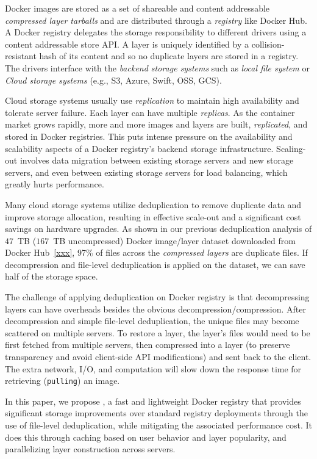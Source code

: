 Docker images are stored as a set of shareable and content addressable \emph{compressed layer tarballs} 
and are distributed through a \emph{registry} like Docker Hub.
A Docker registry delegates the storage responsibility to different drivers using a content addressable store API.
A layer is uniquely identified by a collision-resistant hash of its content and so no duplicate layers are stored in a registry.
The drivers interface with the \emph{backend storage systems}
such as \emph{local file system} or \emph{Cloud storage systems} (e.g., S3, Azure, Swift, OSS, GCS).

Cloud storage systems usually use \emph{replication} to maintain high availability and tolerate server failure.
Each layer can have multiple \emph{replicas}.
As the container market grows rapidly, 
more and more images and layers are built, \emph{replicated}, and stored in Docker registries.
This puts intense pressure on the availability and scalability aspects of a Docker registry's backend storage infrastructure. 
Scaling-out involves data migration between existing storage servers and new storage servers, 
and even between existing storage servers for load balancing,
which greatly hurts performance.

Many cloud storage systems utilize deduplication to remove duplicate data and improve storage allocation, resulting in
effective scale-out and a significant cost savings on hardware upgrades.
As shown in our previous deduplication analysis of $47$~TB ($167$~TB uncompressed) 
Docker image/layer dataset downloaded from Docker Hub~\ref{xxx},
97\% of files across the \emph{compressed layers} are duplicate files.
If decompression and file-level deduplication is applied on the dataset, %
we can save half of the storage space.

The challenge of applying deduplication on Docker registry 
is that decompressing layers can have overheads besides the obvious decompression/compression. 
After decompression and simple file-level deduplication, 
the unique files may become scattered on
multiple servers. 
To restore a layer,
the layer's files would need to be first fetched from multiple servers, then compressed into a layer (to preserve transparency and avoid client-side API modifications)
and sent back to the client.
The extra network, I/O, and computation will slow down the response time for retrieving (\texttt{pulling}) an image.

In this paper, we propose \sysname, a fast and lightweight Docker registry that provides significant storage improvements over standard registry deployments through the use of file-level deduplication, while mitigating the associated performance cost. It does this through caching based on user behavior and layer popularity, and parallelizing layer construction across servers.

